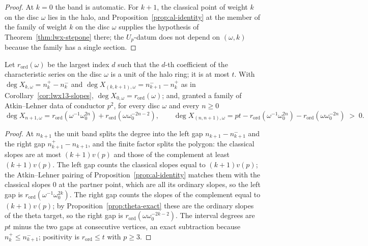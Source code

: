 \begin{proof}
  \leanok
  At $k = 0$ the band is automatic.  For $k+1$, the classical point of weight $k$ on the disc
  $\omega$ lies in the halo, and Proposition~\ref{prop:al-identity} at the member of the family
  of weight $k$ on the disc $\omega$ supplies the hypothesis of Theorem~\ref{thm:lwx-stepone}
  there; the $U_p$-datum does not depend on $(\omega,k)$ because the family has a single section.
\end{proof}

\begin{theorem}
  \label{thm:lwx13-degrees}
  \leanok
  Let $r_{\mathrm{ord}}(\omega)$ be the largest index $d$ such that the $d$-th coefficient of the
  characteristic series on the disc $\omega$ is a unit of the halo ring; it is at most $t$.  With
  $\deg X_{k,\omega} = n_k^{+} - n_k^{-}$ and $\deg X_{(k,k+1),\omega} = n_{k+1}^{-} - n_k^{+}$ as
  in Corollary~\ref{cor:lwx13-slopes}, $\deg X_{0,\omega} = r_{\mathrm{ord}}(\omega)$; and, granted
  a family of Atkin--Lehner data of conductor $p^{2}$, for every disc $\omega$ and every $n \geq 0$
  \[
    \deg X_{n+1,\omega} = r_{\mathrm{ord}}(\omega^{-1}\omega_0^{2n})
      + r_{\mathrm{ord}}(\omega\omega_0^{-2n-2}),
    \qquad
    \deg X_{(n,n+1),\omega} = pt - r_{\mathrm{ord}}(\omega^{-1}\omega_0^{2n})
      - r_{\mathrm{ord}}(\omega\omega_0^{-2n}) \;>\; 0 .
  \]
\end{theorem}

\begin{proof}
  \leanok
  At $n_{k+1}$ the unit band splits the degree into the left gap $n_{k+1} - n_{k+1}^{-}$ and the
  right gap $n_{k+1}^{+} - n_{k+1}$, and the finite factor splits the polygon: the classical
  slopes are at most $(k+1)v(p)$ and those of the complement at least $(k+1)v(p)$.  The left gap
  counts the classical slopes equal to $(k+1)v(p)$; the Atkin--Lehner pairing of
  Proposition~\ref{prop:al-identity} matches them with the classical slopes $0$ at the partner
  point, which are all its ordinary slopes, so the left gap is
  $r_{\mathrm{ord}}(\omega^{-1}\omega_0^{2k})$.  The right gap counts the slopes of the complement
  equal to $(k+1)v(p)$; by Proposition~\ref{prop:theta-exact} these are the ordinary slopes of the
  theta target, so the right gap is $r_{\mathrm{ord}}(\omega\omega_0^{-2k-2})$.  The interval
  degrees are $pt$ minus the two gaps at consecutive vertices, an exact subtraction because
  $n_k^{+} \leq n_{k+1}^{-}$; positivity is $r_{\mathrm{ord}} \leq t$ with $p \geq 3$.
\end{proof}

